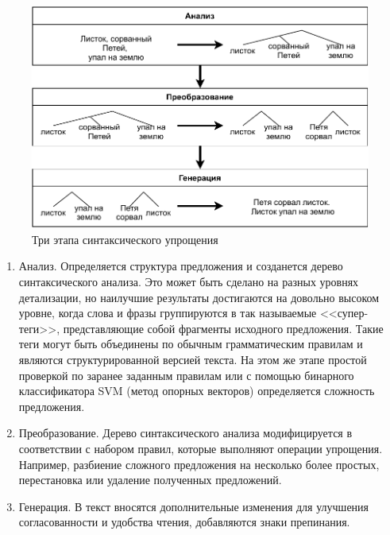 \captionsetup{justification=centering,singlelinecheck=off}
\begin{figure}[h!]
	\centering
		\includegraphics[pages=-, scale=0.9]{./inc/img/3steps_my_new.pdf}
		\caption{Три этапа синтаксического упрощения}  
		\label{fig:3steps}
\end{figure}
\begin{enumerate}
	\item Анализ. Определяется структура предложения и созданется дерево синтаксического анализа. Это может быть сделано на разных уровнях детализации, но наилучшие результаты достигаются на довольно высоком уровне, когда слова и фразы группируются в так называемые <<супер-теги>>, представляющие собой фрагменты исходного предложения. Такие теги могут быть объединены по обычным грамматическим правилам и являются структурированной версией текста. На этом же этапе простой проверкой по заранее заданным правилам или с помощью бинарного классификатора SVM (метод опорных векторов)\cite{shardlow_survey_2014} определяется сложность предложения.
	
	\item Преобразование. Дерево синтаксического анализа модифицируется в соответствии с набором правил, которые выполняют операции упрощения. Например, разбиение сложного предложения на несколько более простых, перестановка или удаление полученных предложений\cite{hutchison_ernesta_2013}.
	
	\item Генерация. В текст вносятся дополнительные изменения для улучшения согласованности и удобства чтения, добавляются знаки препинания.
\end{enumerate}

